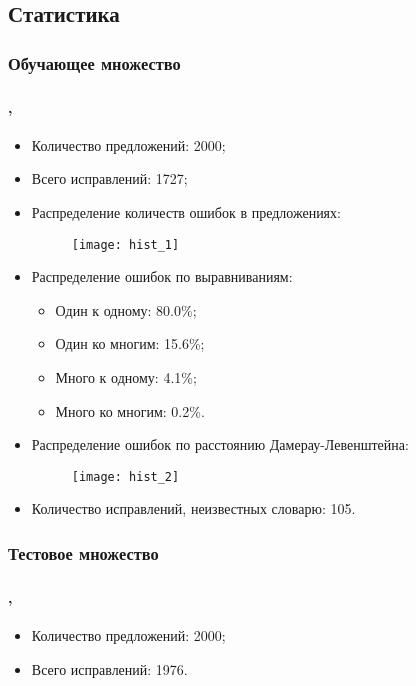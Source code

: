 \documentclass[t]{beamer}  %
\begin{document}
\subsection{Статистика}
\subsubsection{Обучающее множество}
\begin{frame}[allowframebreaks]
	\frametitle{\insertsection} 
	\framesubtitle{\insertsubsection, \insertsubsubsection}
	\begin{itemize}
		\item Количество предложений: 2000;
		\item Всего исправлений: 1727;
		\item Распределение количеств ошибок в предложениях:
		\begin{figure}[!h]
			\begin{center}
				\texttt{[image: hist\_1]}
				\label{ris:hist_1}
			\end{center}
		\end{figure}
		\framebreak
		\item Распределение ошибок по выравниваниям:
			\begin{itemize}
				\item Один к одному: 80.0\%;
				\item Один ко многим: 15.6\%;
				\item Много к одному: 4.1\%;
				\item Много ко многим: 0.2\%.
			\end{itemize}
		\framebreak		
		\item Распределение ошибок по расстоянию Дамерау-Левенштейна:
		\begin{figure}[!h]
			\begin{center}
				\texttt{[image: hist\_2]}
				\label{ris:hist_1}
			\end{center}
		\end{figure}
		\item Количество исправлений, неизвестных словарю: 105.
	\end{itemize}
\end{frame}

\subsubsection{Тестовое множество}
\begin{frame}
	\frametitle{\insertsection} 
	\framesubtitle{\insertsubsection, \insertsubsubsection}
	\begin{itemize}
		\item Количество предложений: 2000;
		\item Всего исправлений: 1976.
	\end{itemize}
\end{frame}
\end{document}
